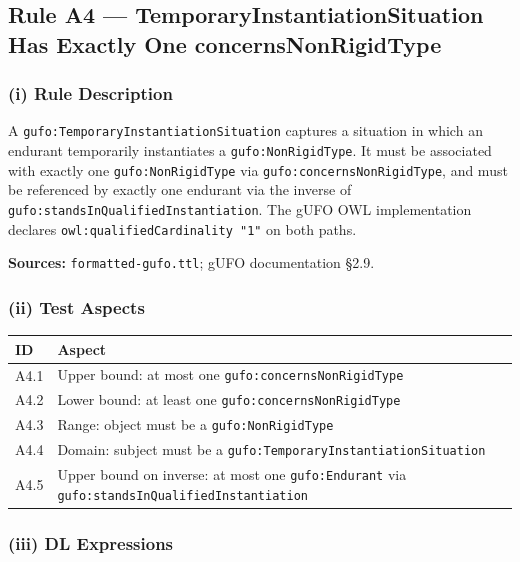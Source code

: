 \documentclass[12pt,a4paper]{article}
\newcommand{\gufoclass}[1]{\nolinkurl{gufo:#1}}
\newcommand{\gufoprop}[1]{\nolinkurl{gufo:#1}}
\begin{document}
\subsection{Rule A4 --- TemporaryInstantiationSituation Has Exactly One concernsNonRigidType}
\label{sec:rule-a4}

\subsubsection*{(i) Rule Description}

A \gufoclass{TemporaryInstantiationSituation} captures a situation in which an
endurant temporarily instantiates a \gufoclass{NonRigidType}. It must be
associated with exactly one \gufoclass{NonRigidType} via
\gufoprop{concernsNonRigidType}, and must be referenced by exactly one endurant
via the inverse of \gufoprop{standsInQualifiedInstantiation}. The gUFO OWL
implementation declares \nolinkurl{owl:qualifiedCardinality "1"} on both paths.

\textbf{Sources:} \texttt{formatted-gufo.ttl}; gUFO documentation \S2.9.

\subsubsection*{(ii) Test Aspects}

\begin{tabular}{lL{9.5cm}}
  \toprule
  \textbf{ID} & \textbf{Aspect} \\
  \midrule
  A4.1 & Upper bound: at most one \gufoprop{concernsNonRigidType} \\
  A4.2 & Lower bound: at least one \gufoprop{concernsNonRigidType} \\
  A4.3 & Range: object must be a \gufoclass{NonRigidType} \\
  A4.4 & Domain: subject must be a \gufoclass{TemporaryInstantiationSituation} \\
  A4.5 & Upper bound on inverse: at most one \gufoclass{Endurant} via
         \gufoprop{standsInQualifiedInstantiation} \\
  \bottomrule
\end{tabular}

\subsubsection*{(iii) DL Expressions}
\end{document}
